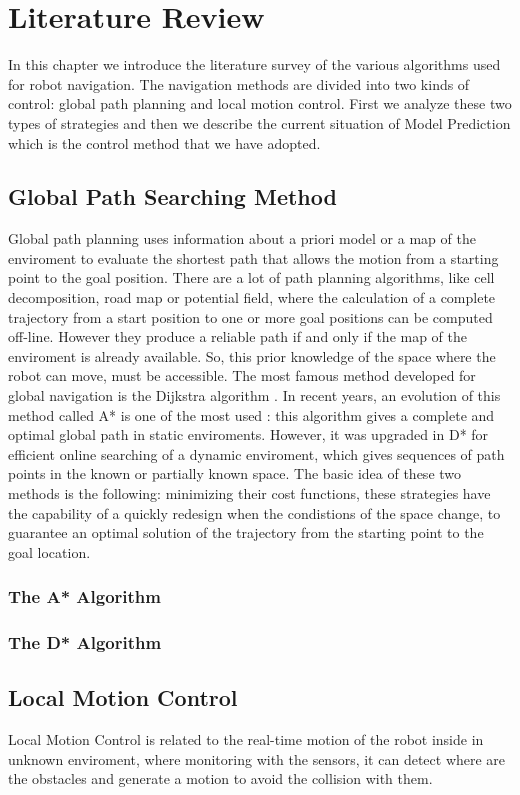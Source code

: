 \chapter{Literature Review}
In this chapter we introduce the literature survey of the various algorithms used for robot navigation. The navigation methods are divided into two kinds of control: global path planning and local motion control. First we analyze these two types of strategies and then we describe the current situation of Model Prediction which is the control method that we have adopted.
\section{Global Path Searching Method}
Global path planning uses information about a priori model or a map of the enviroment to evaluate the shortest path that allows the motion from a starting point to the goal position.
There are a lot of path planning algorithms, like cell decomposition, road map or potential field, where the calculation of a complete trajectory from a start position to one or more goal positions can be computed off-line. However they produce a reliable path if and only if the map of the enviroment is already available. So, this prior knowledge of the space where the robot can move, must be accessible.
The most famous method developed for global navigation is the Dijkstra algorithm \cite{Dijkstra:1959}. In recent years, an evolution of this method called A* is one of the most used \cite{Hart:1968}: this algorithm gives a complete and optimal global path in static enviroments. However, it was upgraded in D* \cite{Stentz93optimaland} for efficient online searching of a dynamic enviroment, which gives sequences of path points in the known or partially known space. The basic idea of these two methods is the following: minimizing their cost functions, these strategies have the capability of a quickly  redesign when the condistions of the space change, to guarantee an optimal solution of the trajectory from the starting point to the goal location.  
\subsection{The A* Algorithm}
\subsection{The D* Algorithm}
\section{Local Motion Control}
Local Motion Control is related to the real-time motion of the robot inside in unknown enviroment, where monitoring with the sensors, it can detect where are the obstacles and generate a motion to avoid the collision with them.
